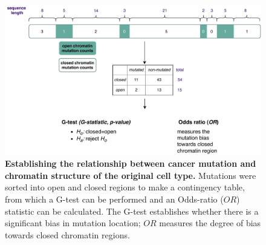 \begin{figure}[h!]
    \centering
    \includegraphics[scale=0.8]{graphics/mutdistribution.pdf}
    \caption{\textbf{Establishing the relationship between cancer mutation and chromatin structure of the original cell type.} Mutations were sorted into open and closed regions to make a contingency table, from which a G-test can be performed and an Odds-ratio ($OR$) statistic can be calculated. The G-test establishes whether there is a significant bias in mutation location; $OR$ measures the degree of bias towards closed chromatin regions.}
    \label{fig:gle_workflow}
\end{figure}

